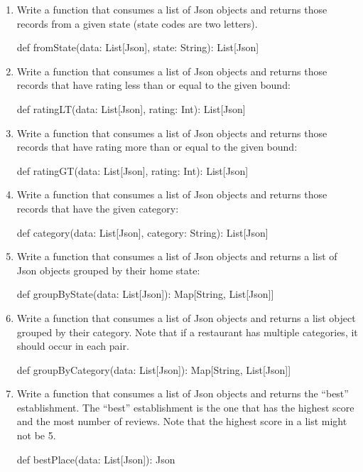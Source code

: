 \begin{enumerate}
    \item Write a function that consumes a list of Json objects and returns
    those records from a given state (state codes are two letters).
    \begin{scalacode}
    def fromState(data: List[Json], state: String): List[Json]
    \end{scalacode}

    \item Write a function that consumes a list of Json objects and returns
    those records that have rating less than or equal to the given bound:
    \begin{scalacode}
    def ratingLT(data: List[Json], rating: Int): List[Json]
    \end{scalacode}

    \item Write a function that consumes a list of Json objects and returns
    those records that have rating more than or equal to the given bound:
    \begin{scalacode}
    def ratingGT(data: List[Json], rating: Int): List[Json]
    \end{scalacode}

    \item Write a function that consumes a list of Json objects and returns
    those records that have the given category:
    \begin{scalacode}
    def category(data: List[Json], category: String): List[Json]
    \end{scalacode}

    \item Write a function that consumes a list of Json objects and returns
    a list of Json objects grouped by their home state:
    \begin{scalacode}
    def groupByState(data: List[Json]): Map[String, List[Json]]
    \end{scalacode}

    \item Write a function that consumes a list of Json objects and returns
    a list object grouped by their category. Note that if a restaurant has
    multiple categories, it should occur in each pair.
    \begin{scalacode}
    def groupByCategory(data: List[Json]): Map[String, List[Json]]
    \end{scalacode}

    \item Write a function that consumes a list of Json objects and returns
    the ``best'' establishment. The ``best'' establishment is the one that
    has the highest score and the most number of reviews. Note that the
    highest score in a list might not be 5.
    \begin{scalacode}
    def bestPlace(data: List[Json]): Json
    \end{scalacode}


\end{enumerate}
